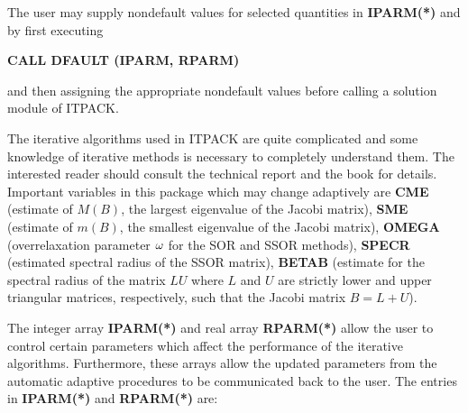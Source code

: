 \bigskip
 
The user may supply nondefault values for selected quantities in
{\bf IPARM(*)} and  by first executing

\bigskip
\centerline{\bf CALL DFAULT (IPARM, RPARM)}
 
\bigskip
\noindent
and then assigning the appropriate nondefault values before calling a
solution module of ITPACK.
 
The iterative algorithms used in ITPACK are quite complicated and some
knowledge of iterative methods is necessary to completely understand
them.  The interested reader should consult the technical report \cite{4} 
and the book \cite{6} for details.  Important variables in this package 
which may change adaptively are {\bf CME} (estimate of $M(B)$, the largest 
eigenvalue of the Jacobi matrix), {\bf SME} (estimate of $m(B)$, the 
smallest eigenvalue of the Jacobi matrix), {\bf OMEGA} (overrelaxation 
parameter $\omega$ for the SOR and SSOR methods), {\bf SPECR} (estimated spectral 
radius of the SSOR matrix), {\bf BETAB} (estimate for the spectral radius 
of the matrix $LU$ where $L$ and $U$ are strictly lower and upper 
triangular matrices, respectively, such that the Jacobi matrix $B=L+U$).
 
The integer array {\bf IPARM(*)} and real array {\bf RPARM(*)} allow 
the user to control certain parameters which affect the performance 
of the iterative algorithms.  Furthermore, these arrays allow the updated 
parameters from the automatic adaptive procedures to be communicated 
back to the user.  The entries in {\bf IPARM(*)} and {\bf RPARM(*)} are:
 
